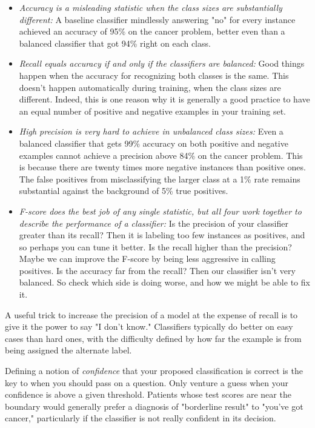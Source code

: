 \documentclass[10pt]{article}
\begin{document}
\begin{itemize}
  \item \textit{Accuracy is a misleading statistic when the class sizes are substantially different:} A baseline classifier mindlessly answering "no" for every instance achieved an accuracy of 95\% on the cancer problem, better even than a balanced classifier that got 94\% right on each class.
  \item \textit{Recall equals accuracy if and only if the classifiers are balanced:} Good things happen when the accuracy for recognizing both classes is the same. This doesn't happen automatically during training, when the class sizes are different. Indeed, this is one reason why it is generally a good practice to have an equal number of positive and negative examples in your training set.
  \item \textit{High precision is very hard to achieve in unbalanced class sizes:} Even a balanced classifier that gets 99\% accuracy on both positive and negative examples cannot achieve a precision above 84\% on the cancer problem. This is because there are twenty times more negative instances than positive ones. The false positives from misclassifying the larger class at a 1\% rate remains substantial against the background of 5\% true positives.
  \item \textit{F-score does the best job of any single statistic, but all four work together to describe the performance of a classifier:} Is the precision of your classifier greater than its recall? Then it is labeling too few instances as positives, and so perhaps you can tune it better. Is the recall higher than the precision? Maybe we can improve the F-score by being less aggressive in calling positives. Is the accuracy far from the recall? Then our classifier isn't very balanced. So check which side is doing worse, and how we might be able to fix it.
\end{itemize}

A useful trick to increase the precision of a model at the expense of recall is to give it the power to say "I don't know." Classifiers typically do better on easy cases than hard ones, with the difficulty defined by how far the example is from being assigned the alternate label.

Defining a notion of \textit{confidence} that your proposed classification is correct is the key to when you should pass on a question. Only venture a guess when your confidence is above a given threshold. Patients whose test scores are near the boundary would generally prefer a diagnosis of "borderline result" to "you've got cancer," particularly if the classifier is not really confident in its decision.
\end{document}
